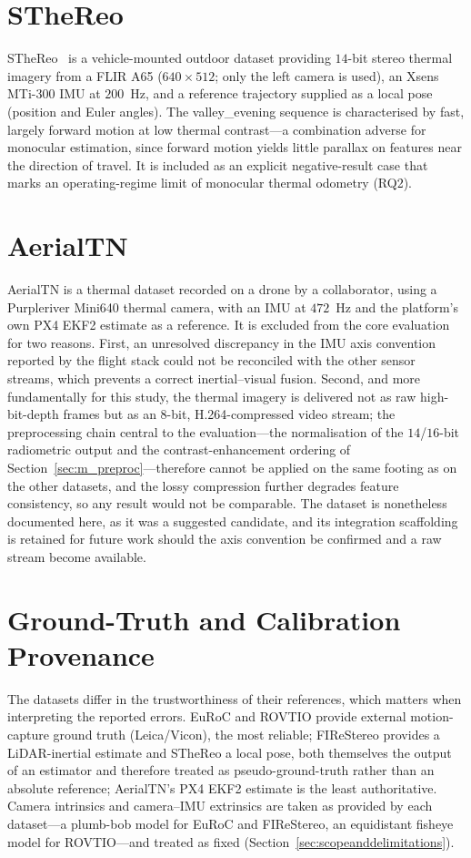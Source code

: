 \section{STheReo}
\label{sec:d_sthereo}
STheReo~\cite{ssyun-2022-iros} is a vehicle-mounted outdoor dataset providing $14$-bit stereo thermal imagery from a FLIR A65 ($640\times512$; only the left camera is used), an Xsens MTi-300 IMU at $200$~Hz, and a reference trajectory supplied as a local pose (position and Euler angles). The valley\_evening sequence is characterised by fast, largely forward motion at low thermal contrast---a combination adverse for monocular estimation, since forward motion yields little parallax on features near the direction of travel. It is included as an explicit negative-result case that marks an operating-regime limit of monocular thermal odometry (RQ2).

\section{AerialTN}
\label{sec:d_aerialtn}
AerialTN is a thermal dataset recorded on a drone by a collaborator, using a Purpleriver Mini640 thermal camera, with an IMU at $472$~Hz and the platform's own PX4 EKF2 estimate as a reference. It is excluded from the core evaluation for two reasons. First, an unresolved discrepancy in the IMU axis convention reported by the flight stack could not be reconciled with the other sensor streams, which prevents a correct inertial--visual fusion. Second, and more fundamentally for this study, the thermal imagery is delivered not as raw high-bit-depth frames but as an $8$-bit, H.264-compressed video stream; the preprocessing chain central to the evaluation---the normalisation of the $14$/$16$-bit radiometric output and the contrast-enhancement ordering of Section~\ref{sec:m_preproc}---therefore cannot be applied on the same footing as on the other datasets, and the lossy compression further degrades feature consistency, so any result would not be comparable. The dataset is nonetheless documented here, as it was a suggested candidate, and its integration scaffolding is retained for future work should the axis convention be confirmed and a raw stream become available.

\section{Ground-Truth and Calibration Provenance}
\label{sec:d_provenance}
The datasets differ in the trustworthiness of their references, which matters when interpreting the reported errors. EuRoC and ROVTIO provide external motion-capture ground truth (Leica/Vicon), the most reliable; FIReStereo provides a LiDAR-inertial estimate and STheReo a local pose, both themselves the output of an estimator and therefore treated as pseudo-ground-truth rather than an absolute reference; AerialTN's PX4 EKF2 estimate is the least authoritative. Camera intrinsics and camera--IMU extrinsics are taken as provided by each dataset---a plumb-bob model for EuRoC and FIReStereo, an equidistant fisheye model for ROVTIO---and treated as fixed (Section~\ref{sec:scopeanddelimitations}).

